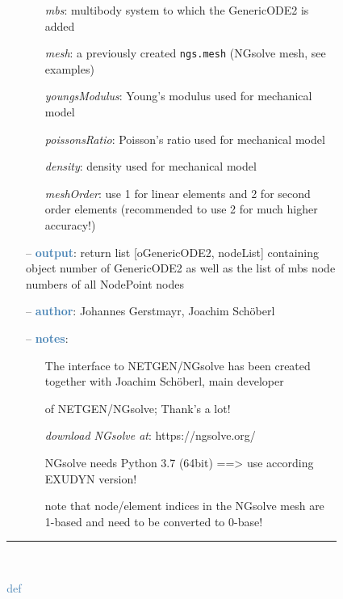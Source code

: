 \begin{itemize}[leftmargin=1.4cm]
\begin{itemize}[leftmargin=0.5cm]
\begin{itemize}[leftmargin=1.4cm]
\begin{itemize}[leftmargin=0.5cm]
\begin{itemize}[leftmargin=0.7cm]
  \begin{itemize}[leftmargin=1.2cm]
\setlength{\itemindent}{-0.7cm}
    \item[] {\it mbs}: multibody system to which the GenericODE2 is added
    \item[] {\it     mesh}: a previously created \texttt{ngs.mesh} (NGsolve mesh, see examples)
    \item[] {\it     youngsModulus}: Young's modulus used for mechanical model
    \item[] {\it     poissonsRatio}: Poisson's ratio used for mechanical model
    \item[] {\it     density}: density used for mechanical model
    \item[] {\it     meshOrder}: use 1 for linear elements and 2 for second order elements (recommended to use 2 for much higher accuracy!)
  \end{itemize}
  \item[--]  \textcolor{steelblue}{\bf output}: return list [oGenericODE2, nodeList] containing object number of GenericODE2 as well as the list of mbs node numbers of all NodePoint nodes  \item[--]  \textcolor{steelblue}{\bf author}: Johannes Gerstmayr, Joachim Sch\"oberl  \item[--]  \textcolor{steelblue}{\bf notes}: \vspace{-6pt}
  \begin{itemize}[leftmargin=1.2cm]
\setlength{\itemindent}{-0.7cm}
    \item[] The interface to NETGEN/NGsolve has been created together with Joachim Sch\"oberl, main developer
    \item[]   of NETGEN/NGsolve; Thank's a lot!
    \item[] {\it   download NGsolve at}: https://ngsolve.org/
    \item[]   NGsolve needs Python 3.7 (64bit) ==> use according EXUDYN version!
    \item[]   note that node/element indices in the NGsolve mesh are 1-based and need to be converted to 0-base!
  \end{itemize}
\vspace{12pt}\end{itemize}
%
\noindent\rule{8cm}{0.75pt}\vspace{1pt} \\ 
\begin{flushleft}
\noindent \textcolor{steelblue}{def {\bf {}}}\label{sec:FEM:FEMinterface:ComputeEigenmodes}

\end{flushleft}
\end{itemize}
\end{itemize}
\end{itemize}
\end{itemize}

